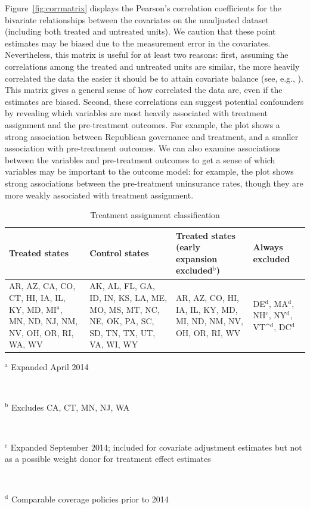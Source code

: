 Figure~\ref{fig:corrmatrix} displays the Pearson's correlation coefficients for the bivariate relationships between the covariates on the unadjusted dataset (including both treated and untreated units). We caution that these point estimates may be biased due to the measurement error in the covariates. Nevertheless, this matrix is useful for at least two reasons: first, assuming the correlations among the treated and untreated units are similar, the more heavily correlated the data the easier it should be to attain covariate balance (see, e.g., \cite{d2021overlap}). This matrix gives a general sense of how correlated the data are, even if the estimates are biased. Second, these correlations can suggest potential confounders by revealing which variables are most heavily associated with treatment assignment and the pre-treatment outcomes. For example, the plot shows a strong association between Republican governance and treatment, and a smaller association with pre-treatment outcomes. We can also examine associations between the variables and pre-treatment outcomes to get a sense of which variables may be important to the outcome model: for example, the plot shows strong associations between the pre-treatment uninsurance rates, though they are more weakly associated with treatment assignment. 

\begin{table}[h!]
\centering
\caption{Treatment assignment classification}\label{tab:txassign}
\begin{tabularx}{\textwidth}{|X|X|X|X|}  \hline
Treated states & Control states & Treated states (early expansion excluded$^\textrm{b}$) & Always excluded \\
  \hline
AR, AZ, CA, CO, CT, HI, IA, IL, KY, MD, MI$^\textrm{a}$, MN, ND, NJ, NM, NV, OH, OR, RI, WA, WV & AK, AL, FL, GA, ID, IN, KS, LA, ME, MO, MS, MT, NC, NE, OK, PA, SC, SD, TN, TX, UT, VA, WI, WY & AR, AZ, CO, HI, IA, IL, KY, MD, MI, ND, NM, NV, OH, OR, RI, WV & DE$^\textrm{d}$, MA$^\textrm{d}$, NH$^\textrm{c}$, NY$^\textrm{d}$, VT^$^\textrm{d}$, DC$^\textrm{d}$ \\ 
   \hline
\end{tabularx}
     \vspace{1ex}

     {\raggedright $^\textrm{a}$ Expanded April 2014 \par \\
     \raggedright $^\textrm{b}$ Excludes CA, CT, MN, NJ, WA \par \\
     \raggedright $^\textrm{c}$ Expanded September 2014; included for covariate adjustment estimates but not as a possible weight donor for treatment effect estimates \par \\
    \raggedright $^\textrm{d}$ Comparable coverage policies prior to 2014 \par}
\end{table}

